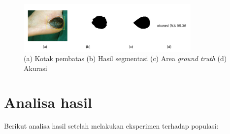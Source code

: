 \begin{figure}[H]
	\centering
	\includegraphics[width=0.8\textwidth]{gambar/hasil_bab4.jpg}
	\caption{(a) Kotak pembatas (b) Hasil segmentasi (c) Area \emph{ground truth} (d) Akurasi}
	\label{img:hasil_segmentasi}
\end{figure}

\section{Analisa hasil}
Berikut analisa hasil setelah melakukan eksperimen terhadap populasi:
